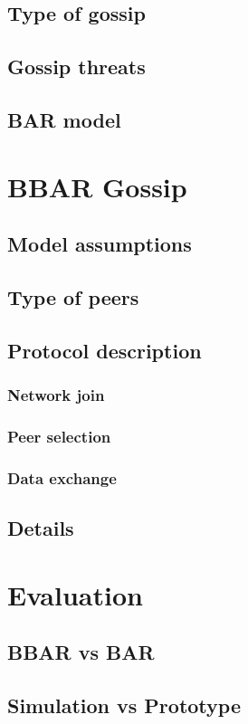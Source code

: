 \documentclass[mscthesis]{usiinfthesis}
\begin{document}
\section{Type of gossip}
\section{Gossip threats}
\section{BAR model}

\chapter{BBAR Gossip}
\section{Model assumptions}
\section{Type of peers}
\section{Protocol description}
\subsection{Network join}
\subsection{Peer selection}
\subsection{Data exchange}
\section{Details}

\chapter{Evaluation}
\section{BBAR vs BAR}
\section{Simulation vs Prototype}
\end{document}
